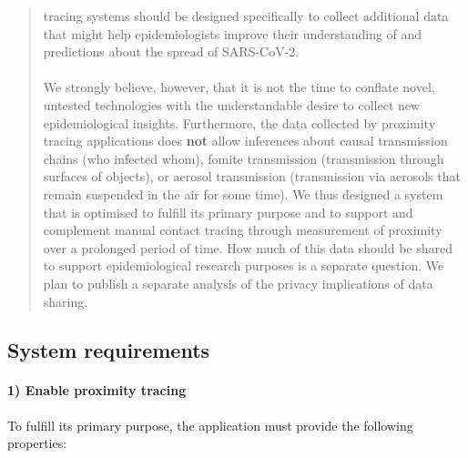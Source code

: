 \documentclass{article}
\begin{document}
\begin{itemize}
\begin{quote}
  tracing systems should be designed specifically to collect additional
  data that might help epidemiologists improve their understanding of
  and predictions about the spread of SARS-CoV-2.\\
  ~\\
  We strongly believe, however, that it is not the time to conflate
  novel, untested technologies with the understandable desire to collect
  new epidemiological insights. Furthermore, the data collected by
  proximity tracing applications does \textbf{not} allow inferences
  about causal transmission chains (who infected whom), fomite
  transmission (transmission through surfaces of objects), or aerosol
  transmission (transmission via aerosols that remain suspended in the
  air for some time). We thus designed a system that is optimised to
  fulfill its primary purpose and to support and complement manual
  contact tracing through measurement of proximity over a prolonged
  period of time. How much of this data should be shared to support
  epidemiological research purposes is a separate question. We plan to
  publish a separate analysis of the privacy implications of data
  sharing.
  \end{quote}
\end{itemize}


\subsection{System requirements}\label{system-requirements}

\paragraph{1) Enable proximity tracing}\label{enable-proximity-tracing}

To fulfill its primary purpose, the application must provide the
following properties:
\end{document}
